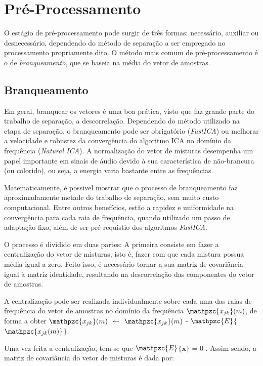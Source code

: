 \section{Pré-Processamento}
        O estágio de pré-processamento pode surgir de três formas: necessário, auxiliar ou desnecessário, dependendo do método de separação a ser empregado no processamento propriamente dito. O método mais comum de pré-processamento é o de \textit{branqueamento}, que se baseia na média do vetor de amostras.
    
    \subsection{Branqueamento}
        Em geral, branquear os vetores é uma boa prática, visto que faz grande parte do trabalho de separação, a descorrelação. Dependendo do método utilizado na etapa de separação, o branqueamento pode ser obrigatório (\textit{FastICA}) ou melhorar a velocidade e robustez da convergência do algoritmo ICA no domínio da frequência (\textit{Natural ICA}). A normalização do vetor de misturas desempenha um papel importante em sinais de áudio devido à sua característica de não-brancura (ou colorido), ou seja, a energia varia bastante entre as frequências.
        
        Matematicamente, é possivel mostrar que o processo de branqueamento faz aproximadamente metade do trabalho de separação, sem muito custo computacional. Entre outros benefícios, estão a rapidez e uniformidade na convergência para cada raia de frequência, quando utilizado um passo de adaptação fixo, além de ser pré-requistio dos algoritmos \textit{FastICA}.
        
        O processo é dividido em duas partes: A primeira consiste em fazer a centralização do vetor de misturas, isto é, fazer com que cada mistura possua média igual a zero. Feito isso, é necessário tornar a sua matriz de covariância igual à matriz identidade, resultando na descorrelação das componentes do vetor de amostras.
        
        A centralização pode ser realizada individualmente sobre cada uma das raias de frequência do vetor de amostras no domínio da frequência $\mathpzc{x_{jk}}(m)$, de forma a obter $\mathpzc{x_{jk}}(m)$ $\leftarrow$ $\mathpzc{x_{jk}}(m)$ - $\mathpzc{E}$$\{$$\mathpzc{x_{jk}(m)}$$\}$.
        
        Uma vez feita a centralização, tem-se que $\mathpzc{E}$$\{$$\mathbf{x}$$\}$ = 0 . Assim sendo, a matriz de covariância do vetor de misturas é dada por:
        
